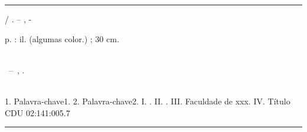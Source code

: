
\imprimircapa

\imprimirfolhaderosto*


%
%     
\begin{fichacatalografica}
        \vspace*{\fill}                                 %
        \hrule                                                  %
        \begin{center}                                  %
        \begin{minipage}[c]{12.5cm}             %
        
        \imprimirautor
        
        \hspace{0.5cm} \imprimirtitulo  / \imprimirautor. --
        \imprimirlocal, \imprimirdata-
        
        \hspace{0.5cm} \pageref{LastPage} p. : il. (algumas color.) ; 30 cm.\\
        
        \hspace{0.5cm} \imprimirorientadorRotulo~\imprimirorientador\\
        
        \hspace{0.5cm}
        \parbox[t]{\textwidth}{\imprimirtipotrabalho~--~\imprimirinstituicao,
        \imprimirdata.}\\
        
        \hspace{0.5cm}
                1. Palavra-chave1.
                2. Palavra-chave2.
                I. \imprimirorientador.
                II. \imprimirinstituicao.
                III. Faculdade de xxx.
                IV. Título\\                    
        
        \hspace{8.75cm} CDU 02:141:005.7\\
        
        \end{minipage}
        \end{center}
        \hrule
\end{fichacatalografica}
